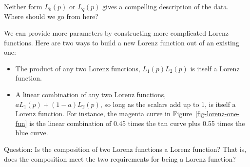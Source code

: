 \documentclass[
  letterpaper,
  DIV=11,
  numbers=noendperiod,
  oneside]{article}
\providecommand{\tightlist}{%
  \setlength{\itemsep}{0pt}\setlength{\parskip}{0pt}}\usepackage{longtable,booktabs,array}
\begin{document}
\begin{multicols}{2}
\begin{table}
\begin{minipage}[t]{\linewidth}
\end{minipage}%
\newline
\begin{minipage}[t]{\linewidth}

{\centering 

Neither form \(L_b(p)\) or \(L_q(p)\) gives a compelling description of
the data. Where should we go from here?

}

\end{minipage}%
\newline
\begin{minipage}[t]{\linewidth}

{\centering 

We can provide more parameters by constructing more complicated Lorenz
functions. Here are two ways to build a new Lorenz function out of an
existing one:

}

\end{minipage}%
\newline
\begin{minipage}[t]{\linewidth}

{\centering 

\begin{itemize}
\tightlist
\item
  The product of any two Lorenz functions, \(L_1(p) L_2(p)\) is itself a
  Lorenz function.
\item
  A linear combination of any two Lorenz functions,
  \(a L_1(p) + (1-a) L_2(p)\), so long as the scalars add up to 1, is
  itself a Lorenz function. For instance, the magenta curve in
  Figure~\ref{fig-lorenz-one-fun} is the linear combination of 0.45
  times the tan curve plus 0.55 times the blue curve.
\end{itemize}

}

\end{minipage}%
\newline
\begin{minipage}[t]{\linewidth}

{\centering 

Question: Is the composition of two Lorenz functions a Lorenz function?
That is, does the composition meet the two requirements for being a
Lorenz function?

}

\end{minipage}%
\newline
\begin{minipage}[t]{\linewidth}


\end{minipage}
\end{table}
\end{multicols}
\end{document}
